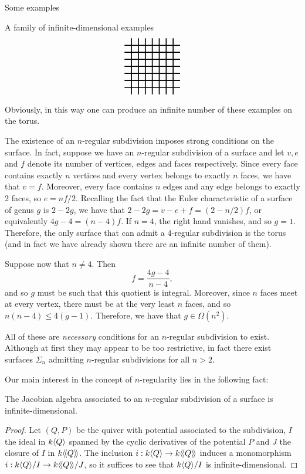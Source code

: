 \begin{chapter}{Some examples}
\begin{section}{A family of infinite-dimensional examples}
\[\begin{tikzpicture}[scale=1.2, very thick]
\foreach \x in {-0.75,-0.5, ..., 0.75}
{
\draw (3+\x, -1) to (3+\x, 1);
\draw (2, \x) to (4, \x);
}
\end{tikzpicture}
\]
Obviously, in this way one can produce an infinite number of these examples on the torus.

The existence of an $n$-regular subdivision imposes strong conditions on the surface. In fact, suppose we have an $n$-regular subdivision of a surface and let $v, e$ and $f$ denote its number of vertices, edges and faces respectively. Since every face contains exactly $n$ vertices and every vertex belongs to exactly $n$ faces, we have that $v=f$. Moreover, every face contains $n$ edges and any edge belongs to exactly 2 faces, so $e=nf/2$.
Recalling the fact that the Euler characteristic of a surface of genus $g$ is $2-2g$, we have that $2-2g=v-e+f=(2-n/2)f$, or equivalently $4g-4 = (n-4)f$. If $n=4$, the right hand vanishes, and so $g=1$. Therefore, the only surface that can admit a $4$-regular subdivision is the torus (and in fact we have already shown there are an infinite number of them).

Suppose now that $n\neq 4$. Then \[f=\frac{4g-4}{n-4},\] and so $g$ must be such that this quotient is integral. Moreover, since $n$ faces meet at every vertex, there must be at the very least $n$ faces, and so $n(n-4)\leq 4(g-1)$. Therefore, we have that $g\in \Omega(n^2)$.

All of these are \emph{necessary} conditions for an $n$-regular subdivision to exist. Although at first they may appear to be too restrictive, in fact there exist surfaces $\Sigma_n$ admitting $n$-regular subdivisions for all $n>2$. \note{\textcolor{red}{completar esto cuando lo tengamos, si es que es cierto :)}}

Our main interest in the concept of $n$-regularity lies in the following fact:

\begin{thm} The Jacobian algebra associated to an $n$-regular subdivision of a surface is infinite-dimensional.
\end{thm}
\begin{proof} Let $(Q,P)$ be the quiver with potential associated to the subdivision, $I$ the ideal in $k\langle Q\rangle$ spanned by the cyclic derivatives of the potential $P$ and $J$ the closure of $I$ in $k\langle\!\langle Q\rangle\!\rangle$. The inclusion $i:k\langle Q\rangle\to k\langle\!\langle Q\rangle\!\rangle$ induces a monomorphism $i:k\langle Q\rangle/I \to k\langle\!\langle Q\rangle\!\rangle/J$, so it suffices to see that $k\langle Q\rangle/I$ is infinite-dimensional. 


\end{proof}
\end{section}
\end{chapter}
